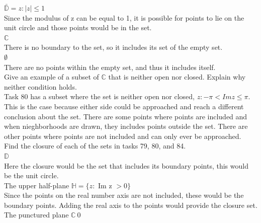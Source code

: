 \documentclass[12pt]{article}
\begin{document}
 $\bar{\mathbb{D}} = {z: |z| \leq 1}$\\

Since the modulus of z can be equal to 1, it is possible for points to lie on the unit circle and those points would be in the set.\\

 $\mathbb{C}$\\

There is no boundary to the set, so it includes its set of the empty set.\\

 $\emptyset$\\

There are no points within the empty set, and thus it includes itself.\\


 Give an example of a subset of $\mathbb{C}$ that is neither open nor closed.
Explain why neither condition holds.\\

Task 80 has a subset where the set is neither open nor closed, ${z: -\pi < Im z \leq \pi}$. 
This is the case because either side could be approached and reach a different conclusion about the set.
There are some points where points are included and when nieghborhoods are drawn, they includes points outside the set.
There are other points where points are not included and can only ever be approached.\\


 Find the closure of each of the sets in tasks 79, 80, and 84.\\

 $\mathbb{D}$\\

Here the closure would be the set that includes its boundary points, 
this would be the unit circle.\\

 The upper half-plane $\mathbb{H} = \{z:$ Im z $ > 0\}$\\

Since the points on the real number axis are not included, these would be the boundary points. 
Adding the real axis to the points would provide the closure set.\\

 The punctured plane $\mathbb{C}\ {0}$ \\
\end{document}
